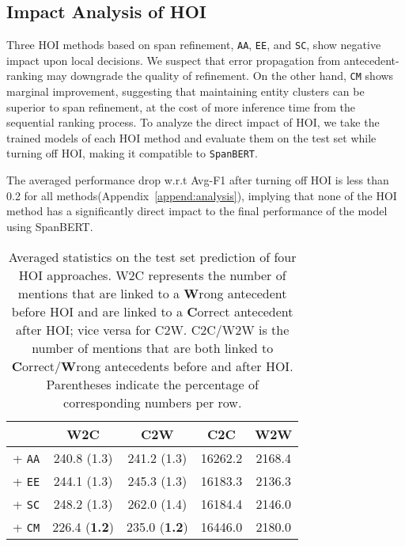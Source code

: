 \documentclass[11pt,a4paper]{article}
\newcommand\LN{\linebreak\noindent}
\begin{document}
\subsection{Impact Analysis of HOI}
\label{subsec:impact}

Three HOI methods based on span refinement, \texttt{AA}, \texttt{EE}, and \texttt{SC}, show negative impact upon local decisions. 
We suspect that error propagation from antecedent-ranking may downgrade the quality of refinement. 
On the other hand, \texttt{CM} shows marginal improvement, suggesting that maintaining entity clusters can be superior to span refinement, at the cost of more inference time from the sequential ranking process.
To analyze the direct impact of HOI, we take the trained models of each HOI method and evaluate them on the test set while turning off HOI, making it compatible to \texttt{SpanBERT}.

The averaged performance drop w.r.t Avg-F1 after turning off HOI is less than 0.2 for all methods\LN (Appendix~\ref{append:analysis}), implying that none of the HOI method has a significantly direct impact to the final performance of the model using SpanBERT.

\begin{table}[htbp!]
\small
\centering
\begin{tabular}{c|cccc}
\multicolumn{1}{c|}{} & \multicolumn{1}{c}{W2C} & \multicolumn{1}{c}{C2W} & \multicolumn{1}{c}{C2C} & \multicolumn{1}{c}{W2W} \\
\midrule
 + \texttt{AA} & 240.8 (1.3) & 241.2 (1.3) & 16262.2 & 2168.4 \\
 + \texttt{EE} & 244.1 (1.3) & 245.3 (1.3) & 16183.3 & 2136.3 \\
 + \texttt{SC} & 248.2 (1.3) & 262.0 (1.4) & 16184.4 & 2146.0 \\
 + \texttt{CM} & 226.4 (\textbf{1.2}) & 235.0 (\textbf{1.2}) & 16446.0 & 2180.0 \\
\end{tabular}
\caption{Averaged statistics on the test set prediction of four HOI approaches. W2C represents the number of mentions that are linked to a \textbf{W}rong antecedent before HOI and are linked to a \textbf{C}orrect antecedent after HOI; vice versa for C2W. C2C/W2W is the number of mentions that are both linked to \textbf{C}orrect/\textbf{W}rong antecedents before and after HOI. Parentheses indicate the percentage of corresponding numbers per row.}
\label{table:link_change}
\vspace{-3ex}
\end{table}
\end{document}
